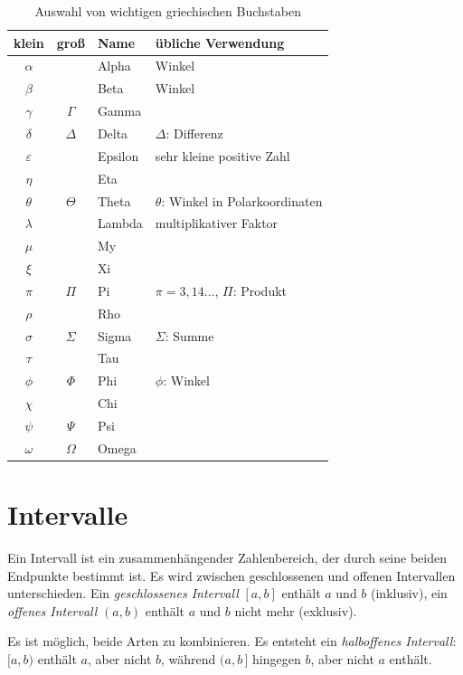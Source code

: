 \begin{table}
\begin{tabular}{cclp{17em}}
\textbf{klein} & \textbf{groß} & \textbf{Name} & \textbf{übliche Verwendung}\\
\hline
$\alpha$& & Alpha & Winkel\\
$\beta$ & & Beta & Winkel\\
$\gamma$ & $\Gamma$ & Gamma & \\
$\delta$ & $\Delta$ & Delta & $\Delta$: Differenz\\
$\varepsilon$ & & Epsilon & sehr kleine positive Zahl\\
$\eta$ & & Eta\\
$\theta$ & $\Theta$ &  Theta & $\theta$: Winkel in Polarkoordinaten\\
$\lambda$ & &  Lambda & multiplikativer Faktor\\
$\mu$ & & My\\
$\xi$ & & Xi \\
$\pi$ & $\Pi$ & Pi & $\pi = 3,14\dots$, $\Pi$: Produkt\\
$\rho$ & & Rho\\
$\sigma$ & $\Sigma$ & Sigma & $\Sigma$: Summe\\
$\tau$ & & Tau \\
$\phi$ & $\Phi$ & Phi & $\phi$: Winkel \\
$\chi$ & & Chi \\
$\psi$ & $\Psi$ & Psi \\
$\omega$ & $\Omega$ & Omega\\
\end{tabular}
\label{tab:griechisch}
\caption{Auswahl von wichtigen griechischen Buchstaben}
\end{table}


\section{Intervalle}
Ein Intervall ist ein zusammenhängender Zahlenbereich, der durch seine beiden
Endpunkte bestimmt ist. Es wird zwischen geschlossenen und
offenen Intervallen unterschieden. Ein \emph{geschlossenes Intervall}
$[a,b]$ enthält $a$ und $b$ (inklusiv), ein \emph{offenes Intervall}
$(a,b)$ enthält $a$ und $b$ nicht mehr (exklusiv).

Es ist möglich, beide Arten zu kombinieren. Es entsteht ein
\emph{halboffenes Intervall}: $[a,b)$ enthält $a$, aber nicht $b$, während
$(a,b\,]$ hingegen $b$, aber nicht $a$ enthält.

